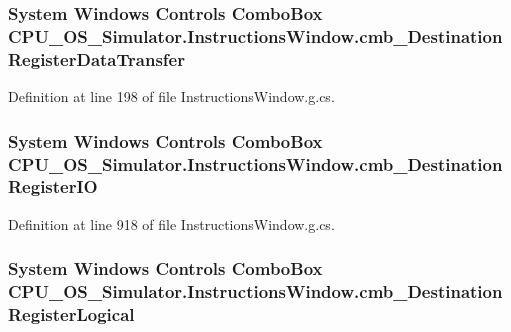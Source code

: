 \subsubsection[{cmb\+\_\+\+Destination\+Register\+Data\+Transfer}]{\setlength{\rightskip}{0pt plus 5cm}System Windows Controls Combo\+Box C\+P\+U\+\_\+\+O\+S\+\_\+\+Simulator.\+Instructions\+Window.\+cmb\+\_\+\+Destination\+Register\+Data\+Transfer\hspace{0.3cm}{\ttfamily [package]}}\label{class_c_p_u___o_s___simulator_1_1_instructions_window_a2cf44cbfe54b2d8f024d5c06067320a1}


Definition at line 198 of file Instructions\+Window.\+g.\+cs.

\hypertarget{class_c_p_u___o_s___simulator_1_1_instructions_window_a821452c6d5ab7be60996d3171a2d4cf1}{}
\subsubsection[{cmb\+\_\+\+Destination\+Register\+I\+O}]{\setlength{\rightskip}{0pt plus 5cm}System Windows Controls Combo\+Box C\+P\+U\+\_\+\+O\+S\+\_\+\+Simulator.\+Instructions\+Window.\+cmb\+\_\+\+Destination\+Register\+I\+O\hspace{0.3cm}{\ttfamily [package]}}\label{class_c_p_u___o_s___simulator_1_1_instructions_window_a821452c6d5ab7be60996d3171a2d4cf1}


Definition at line 918 of file Instructions\+Window.\+g.\+cs.

\hypertarget{class_c_p_u___o_s___simulator_1_1_instructions_window_aefcd87b5db00ac68e7d80ac5fddce8c5}{}
\subsubsection[{cmb\+\_\+\+Destination\+Register\+Logical}]{\setlength{\rightskip}{0pt plus 5cm}System Windows Controls Combo\+Box C\+P\+U\+\_\+\+O\+S\+\_\+\+Simulator.\+Instructions\+Window.\+cmb\+\_\+\+Destination\+Register\+Logical\hspace{0.3cm}{\ttfamily [package]}}\label{class_c_p_u___o_s___simulator_1_1_instructions_window_aefcd87b5db00ac68e7d80ac5fddce8c5}


